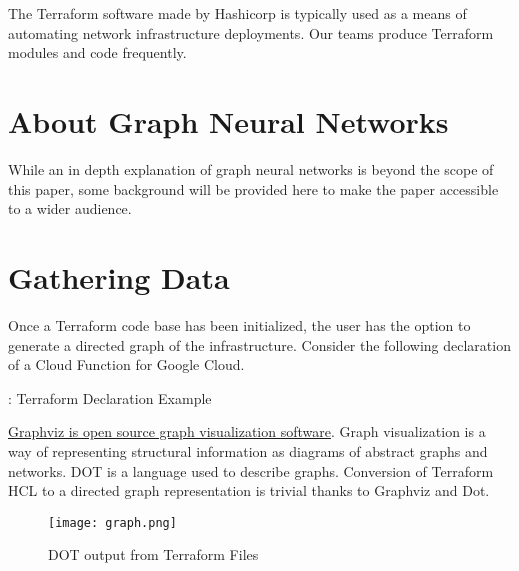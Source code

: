 



\vspace{2mm}

\vspace{2mm}
\section{\label{sec:Introduction}\mytitle}

\justifying
The Terraform software made by Hashicorp is typically used as a means of automating network infrastructure
deployments. Our teams produce Terraform modules and code frequently.

\section{\label{sec:Graph}About Graph Neural Networks}

\justifying
While an in depth explanation of graph neural networks is beyond the scope of this paper, some background will be provided here
to make the paper accessible to a wider audience.

\section{\label{sec:collection}Gathering Data}

\justifying
Once a Terraform code base has been initialized, the user has the option to generate a directed graph of the infrastructure. Consider the following declaration of a Cloud Function for Google Cloud.

\begin{mybox}{\thetcbcounter: Terraform Declaration Example}
    
\end{mybox}


\justifying
\href{https://graphviz.org/}{Graphviz is open source graph visualization software}. Graph visualization is a way of representing
structural information as diagrams of abstract graphs and networks. DOT is a language used to describe graphs. Conversion of
Terraform HCL to a directed graph representation is trivial thanks to Graphviz and Dot.

\justifying
\begin{figure}[H]
	\texttt{[image: graph.png]}
	\caption{DOT output from Terraform Files}
	\label{design}
\end{figure}


